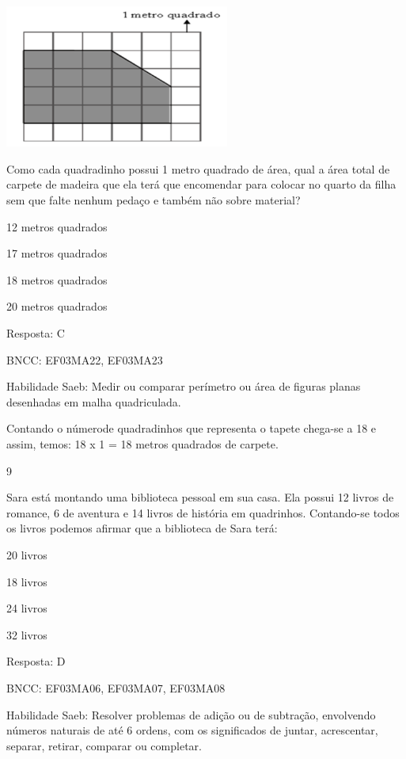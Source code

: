 \begin{escolha}
\includegraphics[width=2.90385in,height=1.84662in]{media/image123.png}

Como cada quadradinho possui 1 metro quadrado de área, qual a área total
de carpete de madeira que ela terá que encomendar para colocar no quarto
da filha sem que falte nenhum pedaço e também não sobre material?

\begin{escolha}
\item
  12 metros quadrados
\item
  17 metros quadrados
\item
  18 metros quadrados
\item
  20 metros quadrados
\end{escolha}

Resposta: C

BNCC: EF03MA22, EF03MA23

Habilidade Saeb: Medir ou comparar perímetro ou área de figuras planas
desenhadas em malha quadriculada.

Contando o númerode quadradinhos que representa o tapete chega-se a 18 e
assim, temos: 18 x 1 = 18 metros quadrados de carpete.

\num{9}

Sara está montando uma biblioteca pessoal em sua casa. Ela possui 12
livros de romance, 6 de aventura e 14 livros de história em quadrinhos.
Contando-se todos os livros podemos afirmar que a biblioteca de Sara
terá:

\begin{escolha}
\item
  20 livros
\item
  18 livros
\item
  24 livros
\item
  32 livros
\end{escolha}

Resposta: D

BNCC: EF03MA06, EF03MA07, EF03MA08

Habilidade Saeb: Resolver problemas de adição ou de subtração,
envolvendo números naturais de até 6 ordens, com os significados de
juntar, acrescentar, separar, retirar, comparar ou completar.


\end{escolha}
